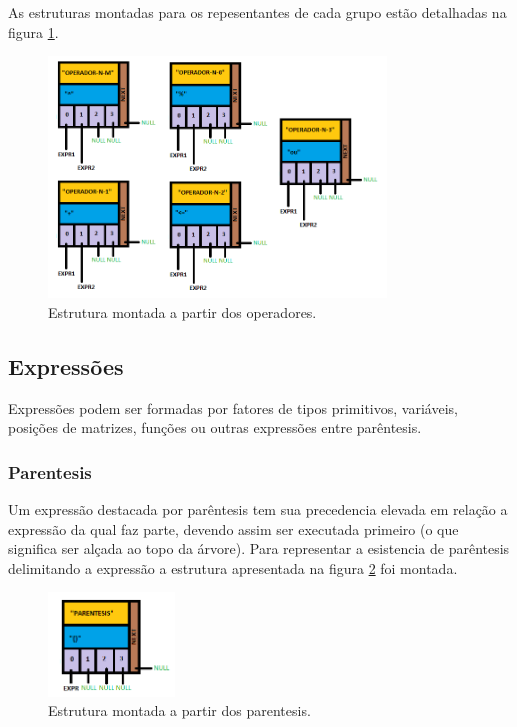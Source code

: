 \documentclass[a4paper,12pt]{report}
\begin{document}
As estruturas montadas para os repesentantes de cada grupo estão detalhadas na figura \ref{fig:operadores}.

\begin{figure}
\centering
\includegraphics[width=0.8\textwidth]{imgs/Operadores.png}
\caption{\label{fig:operadores}Estrutura montada a partir dos operadores.}
\end{figure}

\subsection{Express\~oes}

Express\~oes podem ser formadas por fatores de tipos primitivos, vari\'aveis, posi\c{c}\~oes de matrizes, fun\c{c}\~oes ou outras express\~oes entre par\^entesis.

\subsubsection{Parentesis}

Um express\~ao destacada por par\^entesis tem sua precedencia elevada em rela\c{c}\~ao a express\~ao da qual faz parte, devendo assim ser executada primeiro (o que significa ser al\c{c}ada ao topo da \'arvore). Para representar a esistencia de par\^entesis delimitando a express\~ao a estrutura apresentada na figura \ref{fig:parentesis} foi montada.

\begin{figure}
\centering
\includegraphics[width=0.3\textwidth]{imgs/Parentesis.png}
\caption{\label{fig:parentesis}Estrutura montada a partir dos parentesis.}
\end{figure}
\end{document}
